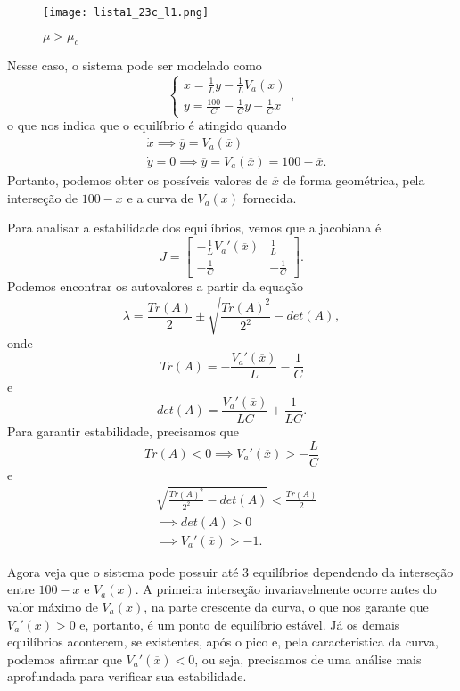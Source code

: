 \documentclass[a4paper]{report}
\begin{document}
\begin{figure}[H]
    \centering
    \texttt{[image: lista1\_23c\_l1.png]}
    \caption{$\mu>\mu_c$}
    \label{fig:lista1_23c_l-1-png}
\end{figure}



Nesse caso, o sistema pode ser modelado como \[
\begin{cases}
    \dot{x} = \frac{1}{L}y -\frac{1}{L}V_a\left( x \right) \\
    \dot{y} = \frac{100}{C} -\frac{1}{C}y -\frac{1}{C}x
\end{cases}
,\] o que nos indica que o equilíbrio é atingido quando
\begin{align*}
    & \dot{x} \implies \overline{y} = V_a(\overline{x}) \\
    & \dot{y} = 0 \implies \overline{y} = V_a(\overline{x}) = 100 - \overline{x}
.\end{align*}
Portanto, podemos obter os possíveis valores de $\overline{x}$ de forma geométrica, pela interseção de $100 - x$ e a curva de $V_a(x)$ fornecida.

Para analisar a estabilidade dos equilíbrios, vemos que a jacobiana é \[
J = \begin{bmatrix} 
    -\frac{1}{L}V_a'(\overline{x}) & \frac{1}{L} \\
    -\frac{1}{C} & -\frac{1}{C}
    \end{bmatrix}
.\] Podemos encontrar os autovalores a partir da equação \[
\lambda = \frac{Tr(A)}{2} \pm \sqrt{\frac{Tr(A)^2}{2^2} -det(A)} 
,\] onde \[
Tr(A) = -\frac{V_a'(\overline{x})}{L} - \frac{1}{C}
\] e \[
det(A) = \frac{V_a'(\overline{x})}{LC} + \frac{1}{LC}
.\] Para garantir estabilidade, precisamos que \[
Tr(A) < 0 \implies V_a'(\overline{x}) > - \frac{L}{C}
\] e 
\begin{align*}
    & \sqrt{\frac{Tr(A)^2}{2^2} -det(A)} < \frac{Tr(A)}{2} \\
    & \implies det(A) > 0 \\
    &\implies V_a'(\overline{x}) > -1
.\end{align*}

Agora veja que o sistema pode possuir até 3 equilíbrios dependendo da interseção entre $100-x$ e $V_a(x)$. A primeira interseção invariavelmente ocorre antes do valor máximo de $V_a(x)$, na parte crescente da curva, o que nos garante que $V_a'(\overline{x}) > 0$ e, portanto, é um ponto de equilíbrio estável. Já os demais equilíbrios acontecem, se existentes, após o pico e, pela característica da curva, podemos afirmar que $V_a'(\overline{x})<0$, ou seja, precisamos de uma análise mais aprofundada para verificar sua estabilidade.
\end{document}
